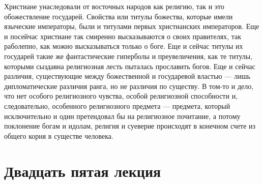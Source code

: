 \documentclass[12pt]{article}
\begin{document}
Христиане унаследовали от восточных народов как религию, так и это обожествление государей. Свойства или титулы божества, которые имели языческие императоры, были и титулами первых христианских императоров. Еще и посейчас христиане так смиренно высказываются о своих правителях, так раболепно, как можно высказываться только о боге. Еще и сейчас титулы их государей такие же фантастические гиперболы и преувеличения, как те титулы, которыми сыздавна религиозная лесть пыталась прославить богов. Еще и сейчас различия, существующие между божественной и государевой властью --- лишь дипломатические различия ранга, но не различия по существу. В том-то и дело, что нет особого религиозного чувства, особой религиозной способности и, следовательно, особенного религиозного предмета --- предмета, который исключительно и один претендовал бы на религиозное почитание, а потому поклонение богам и идолам, религия и суеверие происходят в конечном счете из общего корня в существе человека. 

\section*{Двадцать пятая лекция}
\end{document}
